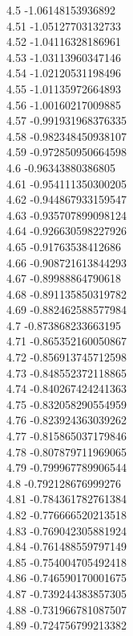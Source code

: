 {4.5	-1.06148153936892\\
4.51	-1.05127703132733\\
4.52	-1.04116328186961\\
4.53	-1.03113960347146\\
4.54	-1.02120531198496\\
4.55	-1.01135972664893\\
4.56	-1.00160217009885\\
4.57	-0.991931968376335\\
4.58	-0.982348450938107\\
4.59	-0.972850950664598\\
4.6	-0.96343880386805\\
4.61	-0.954111350300205\\
4.62	-0.944867933159547\\
4.63	-0.935707899098124\\
4.64	-0.926630598227926\\
4.65	-0.91763538412686\\
4.66	-0.908721613844293\\
4.67	-0.89988864790618\\
4.68	-0.891135850319782\\
4.69	-0.882462588577984\\
4.7	-0.873868233663195\\
4.71	-0.865352160050867\\
4.72	-0.856913745712598\\
4.73	-0.848552372118865\\
4.74	-0.840267424241363\\
4.75	-0.832058290554959\\
4.76	-0.823924363039262\\
4.77	-0.815865037179846\\
4.78	-0.807879711969065\\
4.79	-0.799967789906544\\
4.8	-0.792128676999276\\
4.81	-0.784361782761384\\
4.82	-0.776666520213518\\
4.83	-0.769042305881924\\
4.84	-0.761488559797149\\
4.85	-0.754004705492418\\
4.86	-0.746590170001675\\
4.87	-0.739244383857305\\
4.88	-0.731966781087507\\
4.89	-0.724756799213382\\
}
